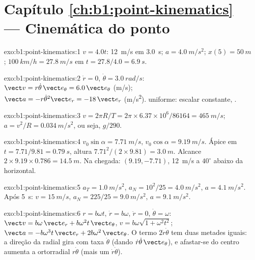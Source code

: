 \section*{Capítulo \ref{ch:b1:point-kinematics} --- Cinemática do ponto}

\begin{solution}{exo:b1:point-kinematics:1}
$v = 4.0t$: \qty{12}{m/s} em \qty{3.0}{s}; $a = \qty{4.0}{m/s^2}$;
$x(5) = \qty{50}{m}$; $\qty{100}{km/h} = \qty{27.8}{m/s}$ em $t = 27.8/4.0
= \qty{6.9}{s}$.
\end{solution}

\begin{solution}{exo:b1:point-kinematics:2}
$\dot r = 0$, $\dot\theta = \qty{3.0}{rad/s}$: $\vect v = r\dot\theta\,\vect e_\theta
= 6.0\,\vect e_\theta$ (\unit{m/s}); $\vect a = -r\dot\theta^2\vect e_r =
-18\,\vect e_r$ (\unit{m/s^2}).  uniforme:  escalar constante,
.
\end{solution}

\begin{solution}{exo:b1:point-kinematics:3}
$v = 2\pi R/T = 2\pi \times 6.37\times10^6/86164 = \qty{465}{m/s}$;
$a = v^2/R = \qty{0.034}{m/s^2}$, ou seja, $g/290$.
\end{solution}

\begin{solution}{exo:b1:point-kinematics:4}
$v_0\sin\alpha = \qty{7.71}{m/s}$, $v_0\cos\alpha = \qty{9.19}{m/s}$.
Ápice em $t = 7.71/9.81 = \qty{0.79}{s}$, altura $7.71^2/(2 \times 9.81) =
\qty{3.0}{m}$. Alcance $2 \times 9.19 \times 0.786 = \qty{14.5}{m}$.
Na chegada: $(9.19, -7.71)$, \qty{12}{m/s} a $40^\circ$ abaixo da
horizontal.
\end{solution}

\begin{solution}{exo:b1:point-kinematics:5}
$a_T = \qty{1.0}{m/s^2}$, $a_N = 10^2/25 = \qty{4.0}{m/s^2}$, $a =
\qty{4.1}{m/s^2}$. Após \qty{5}{s}: $v = \qty{15}{m/s}$, $a_N = 225/25 =
\qty{9.0}{m/s^2}$, $a = \qty{9.1}{m/s^2}$.
\end{solution}

\begin{solution}{exo:b1:point-kinematics:6}
$r = b\omega t$, $\dot r = b\omega$, $\ddot r = 0$, $\dot\theta = \omega$:
$\vect v = b\omega\,\vect e_r + b\omega^2 t\,\vect e_\theta$, $v = b\omega
\sqrt{1 + \omega^2t^2}$; $\vect a = -b\omega^3 t\,\vect e_r + 2b\omega^2\,
\vect e_\theta$. O termo $2\dot r\dot\theta$ tem duas metades iguais: a
direção da  radial gira com taxa $\dot\theta$ (dando
$\dot r\dot\theta\,\vect e_\theta$), e afastar-se do centro aumenta a
 ortorradial $r\dot\theta$ (mais um $\dot r\dot\theta$).
\end{solution}

